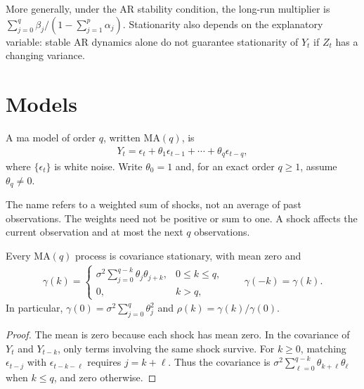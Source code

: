 \documentclass[a4paper,12pt]{article}
\begin{document}
\begin{remark}
	More generally, under the AR stability condition, the long-run multiplier is
	$\sum_{j=0}^q\beta_j/(1-\sum_{j=1}^p\alpha_j)$.
	Stationarity also depends on the explanatory variable: stable AR dynamics alone do not guarantee stationarity of $Y_t$
	if $Z_t$ has a changing variance.
\end{remark}

\section{ Models}\label{sec-ma}

\begin{definition}
	A \gls{ma} model of order $q$, written $\mathrm{MA}(q)$, is
	\begin{align}
		Y_t=\epsilon_t+\theta_1\epsilon_{t-1}+\cdots+\theta_q\epsilon_{t-q},
	\end{align}
	where $\{\epsilon_t\}$ is white noise.
	Write $\theta_0=1$ and, for an exact order $q\ge1$, assume $\theta_q\neq0$.
\end{definition}

\begin{remark}
	The name refers to a weighted sum of shocks, not an average of past observations.
	The weights need not be positive or sum to one.
	A shock affects the current observation and at most the next $q$ observations.
\end{remark}

\begin{proposition}\label{prop-ma-cov}
	Every $\mathrm{MA}(q)$ process is covariance stationary, with mean zero and
	\begin{align}
		\gamma(k)=
		\begin{cases}
			\sigma^2\displaystyle\sum_{j=0}^{q-k}\theta_j\theta_{j+k}, & 0\le k\le q,\\
			0, & k>q,
		\end{cases}
		\qquad \gamma(-k)=\gamma(k).
	\end{align}
	In particular, $\gamma(0)=\sigma^2\sum_{j=0}^q\theta_j^2$ and $\rho(k)=\gamma(k)/\gamma(0)$.
\end{proposition}
\begin{proof}
	The mean is zero because each shock has mean zero.
	In the covariance of $Y_t$ and $Y_{t-k}$, only terms involving the same shock survive.
	For $k\ge0$, matching $\epsilon_{t-j}$ with $\epsilon_{t-k-\ell}$ requires $j=k+\ell$.
	Thus the covariance is $\sigma^2\sum_{\ell=0}^{q-k}\theta_{k+\ell}\theta_\ell$
	when $k\le q$, and zero otherwise.
\end{proof}
\end{document}

